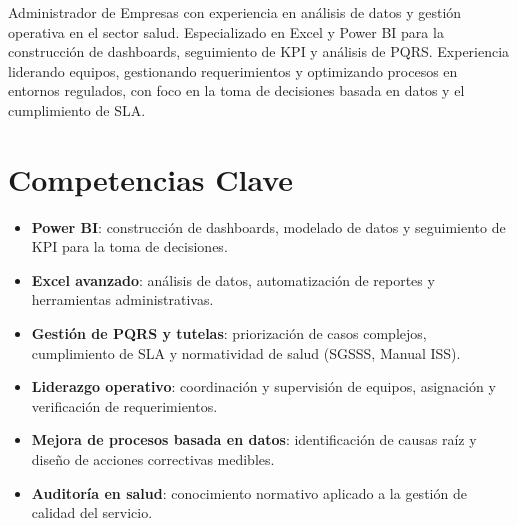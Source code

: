 \documentclass[11pt,a4paper,sans]{moderncv}
\begin{document}
\makecvtitle


\vspace{6pt}
\small{Administrador de Empresas con experiencia en análisis de datos y gestión operativa en el sector salud. Especializado en Excel y Power BI para la construcción de dashboards, seguimiento de KPI y análisis de PQRS. Experiencia liderando equipos, gestionando requerimientos y optimizando procesos en entornos regulados, con foco en la toma de decisiones basada en datos y el cumplimiento de SLA.}


\section{Competencias Clave}
\vspace{1pt}
\begin{itemize}

\item \textbf{Power BI}: construcción de dashboards, modelado de datos y seguimiento de KPI para la toma de decisiones.

\item \textbf{Excel avanzado}: análisis de datos, automatización de reportes y herramientas administrativas.

\item \textbf{Gestión de PQRS y tutelas}: priorización de casos complejos, cumplimiento de SLA y normatividad de salud (SGSSS, Manual ISS).

\item \textbf{Liderazgo operativo}: coordinación y supervisión de equipos, asignación y verificación de requerimientos.

\item \textbf{Mejora de procesos basada en datos}: identificación de causas raíz y diseño de acciones correctivas medibles.

\item \textbf{Auditoría en salud}: conocimiento normativo aplicado a la gestión de calidad del servicio.

\end{itemize}

\end{document}
